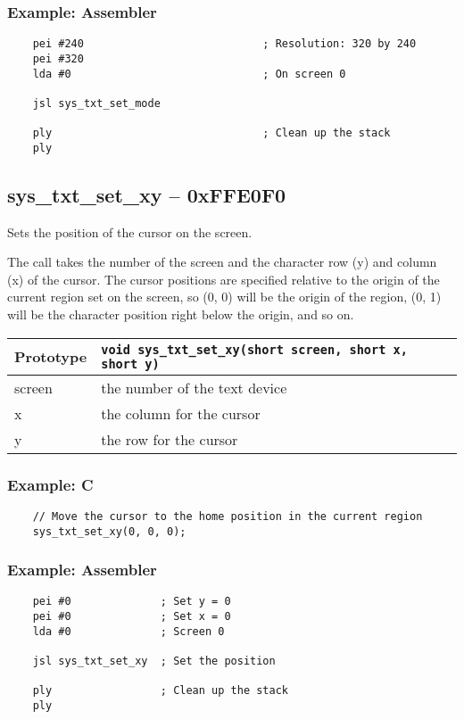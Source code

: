 \subsubsection*{Example: Assembler}
\begin{verbatim}
    pei #240							; Resolution: 320 by 240
	pei #320
    lda #0                           	; On screen 0
    
    jsl sys_txt_set_mode

    ply                                 ; Clean up the stack
	ply
\end{verbatim}


\subsection*{sys\_txt\_set\_xy -- 0xFFE0F0}
Sets the position of the cursor on the screen.

The call takes the number of the screen and the character row (y) and column (x) of the cursor.
The cursor positions are specified relative to the origin of the current region set on the screen, so (0, 0)
will be the origin of the region, (0, 1) will be the character position right below the origin, and so on.

\bigskip

\begin{tabular}{|l||l|} \hline
Prototype & \lstinline!void sys_txt_set_xy(short screen, short x, short y)! \\ \hline
screen & the number of the text device \\ \hline
x & the column for the cursor \\ \hline
y & the row for the cursor \\ \hline
\end{tabular}

\subsubsection*{Example: C}
\begin{lstlisting}
    // Move the cursor to the home position in the current region
    sys_txt_set_xy(0, 0, 0);
\end{lstlisting}

\subsubsection*{Example: Assembler}
\begin{verbatim}
    pei #0              ; Set y = 0
    pei #0              ; Set x = 0
    lda #0              ; Screen 0

    jsl sys_txt_set_xy  ; Set the position

    ply                 ; Clean up the stack
    ply
\end{verbatim}

